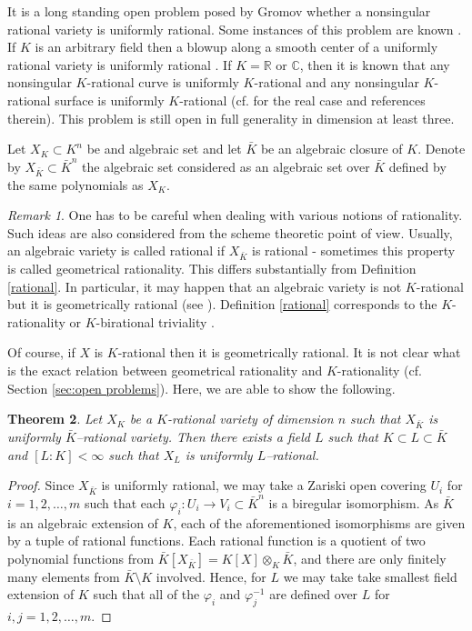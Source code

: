 \documentclass[12pt,reqno]{amsart}   	%
\newtheorem{thm}{Theorem}[section]
\theoremstyle{obs}
\theoremstyle{prob}
\theoremstyle{conj}
\theoremstyle{remark}
\newtheorem{remark}[thm]{Remark}
\newcommand{\R}{\mathbb{R}}
\begin{document}
It is a long standing open problem posed by Gromov \cite{gromov1989} whether a nonsingular rational variety is uniformly rational. Some instances of this problem are known \cite{bb2014}.
If $K$ is an arbitrary field then a blowup along a smooth center of a uniformly rational variety is uniformly rational \cite{bhsv2008}.
If $K=\R$ or $\mathbb{C}$, then it is known that any nonsingular $K$-rational curve is uniformly $K$-rational and any nonsingular $K$-rational surface is uniformly $K$-rational (cf. \cite{bk2025} for the real case and references therein). This problem is still open in full generality in dimension at least three.

Let $X_K \subset K^n$ be and algebraic set and let $\bar{K}$ be an algebraic closure of $K$. Denote by $X_{\bar{K}} \subset \bar{K}^n$ the algebraic set considered as an algebraic set over $\bar{K}$ defined by the same polynomials as $X_K$.


\begin{remark}
One has to be careful when dealing with various notions of rationality. Such ideas are also considered from the scheme theoretic point of view. Usually, an algebraic variety is called rational if $X_{\bar{K}}$ is rational - sometimes this property is called geometrical rationality. This differs substantially from Definition \ref{rational}. In particular, it may happen that an algebraic variety is not $K$-rational but it is geometrically rational (see \cite[Example 1.3]{kollar1995}). Definition \ref{rational} corresponds to the $K$-rationality \cite[Definition 2.1]{kollar1995} or $K$-birational triviality \cite[Definition 12.4]{manin1986}. 
\end{remark}
 Of course, if $X$ is $K$-rational then it is geometrically rational. 
 It is not clear what is the exact relation between geometrical rationality and $K$-rationality (cf. Section \ref{sec:open problems}). Here, we are able to show the following. 


\begin{thm}
Let $X_K$ be a $K$-rational variety of dimension $n$ such that $X_{\bar{K}}$ is uniformly $\bar{K}$--rational variety. Then there exists a field $L$ such that $K 
\subset L \subset \bar{K}$ and $[L:K] <\infty$ such that $X_L$ is uniformly $L$--rational.


\end{thm}
\begin{proof}
Since $X_{\bar{K}}$ is uniformly rational, we may take a Zariski open covering $U_i$ for $i=1,2,\dots, m$ such that each $\varphi_i: U_i \rightarrow V_i \subset \bar{K}^n$ is a biregular isomorphism. As $\bar{K}$ is an algebraic extension of $K$, each of the aforementioned isomorphisms are given by a tuple of rational functions. Each rational function is a quotient of two polynomial functions from $\bar{K}[X_{\bar{K}}]=K[X]\otimes_K \bar{K}$, and there are only finitely  many elements from $\bar{K}\setminus K$ involved. Hence, for $L$ we may take take smallest field extension of $K$ such that all of the $\varphi_i$ and $\varphi_j^{-1}$ are defined over $L$ for $i,j=1,2,\dots, m$.

\end{proof}
\end{document}
